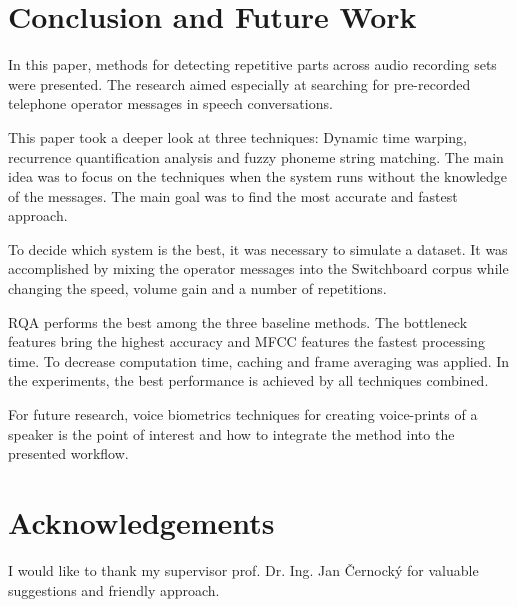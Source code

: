 \documentclass{ExcelAtFIT}
\begin{document}
\section{Conclusion and Future Work}
In this paper, methods for detecting repetitive parts across audio recording sets were presented. The research aimed especially at searching for pre-recorded telephone operator messages in speech conversations.

This paper took a deeper look at three techniques: Dynamic time warping, recurrence quantification analysis and fuzzy phoneme string matching. The main idea was to focus on the techniques when the system runs without the knowledge of the messages. The main goal was to find the most accurate and fastest approach.

To decide which system is the best, it was necessary to simulate a dataset. It was accomplished by mixing the operator messages into the Switchboard corpus while changing the speed, volume gain and a number of repetitions.

RQA performs the best among the three baseline methods. The bottleneck features bring the highest accuracy and MFCC features the fastest processing time. To decrease computation time, caching and frame averaging was applied. 
In the experiments, the best performance is achieved by all techniques combined. 

For future research, voice biometrics techniques for creating voice-prints of a speaker is the point of interest and how to integrate the method into the presented workflow. 

\section*{Acknowledgements}
I would like to thank my supervisor prof. Dr. Ing. Jan Černocký for valuable suggestions and friendly approach.


% 


\end{document}
